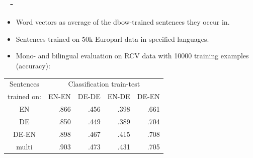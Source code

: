 \documentclass{beamer}
\newenvironment{dia}
{
\begin{frame}[fragile, environment=dia]
\frametitle{\insertsection
\ifx\insertsubsection\empty\else
      \,~-~\insertsubsection             %
   \fi}
}
{
\end{frame}
}
\begin{document}
\begin{dia}
\begin{itemize}
\item Word vectors as average of the dbow-trained sentences they occur in.
\item Sentences trained on 50k Europarl data in specified languages.
\item Mono- and bilingual evaluation on RCV data with 10000 training examples (accuracy):
\end{itemize}
\begin{table}
\begin{tabular}{c |r r r r }
Sentences 		&	\multicolumn{4}{c}{Classification train-test}	\\
trained on: 		&EN-EN	&DE-DE	&EN-DE	&DE-EN	\\\hline
EN			&.866		&.456		&.398		&.661		\\
DE			&.850		&.449		&.389		&.704		\\
DE-EN			&.898		&.467		&.415		&.708		\\
multi 			&.903		&.473		&.431		&.705		\\
\end{tabular}
\end{table}
\end{dia}
\end{document}
